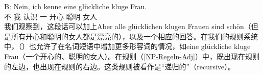\gll B: Nein, ich kenne eine glückliche kluge Frau.\\
	\spacebr{} 不 我 认识 一 开心 聪明 女人\\
\z
我们观察到，这段话可以加上Aber alle glücklichen
  klugen Frauen sind schön（但是所有开心和聪明的女人都是漂亮的），以及一个相应的回答。在我们的规则系统中，（）也允许了在名词短语中增加更多形容词的情况，如eine glückliche kluge Frau（一个开心的、聪明的女人）。在规则（\ref{NP-Regeln-Adj}）中，\nbarc 既出现在规则的左边，也出现在规则的右边。这类规则被看作是“递归的”（recursive）。


